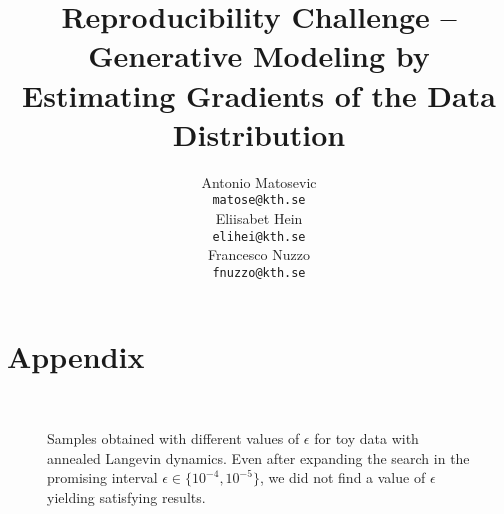 \documentclass{article}
\title{Reproducibility Challenge -- Generative Modeling by Estimating Gradients of the Data Distribution}
\author{%
  Antonio Matosevic \\
  \texttt{matose@kth.se} \\
  \And
  Eliisabet Hein \\
  \texttt{elihei@kth.se} \\
  \And
  Francesco Nuzzo \\
  \texttt{fnuzzo@kth.se} \\
}
\begin{document}
\maketitle



















\small




\clearpage
\section*{Appendix}


\begin{figure}[h!]
  \centering
     \\
     \caption{Samples obtained with different values of $\epsilon$ for toy data with annealed Langevin dynamics. Even after expanding the search in the promising interval $\epsilon \in \{10^{-4}, 10^{-5}\}$, we did not find a value of $\epsilon$ yielding satisfying results.}
     \label{fig:eps}
\end{figure}
\end{document}
